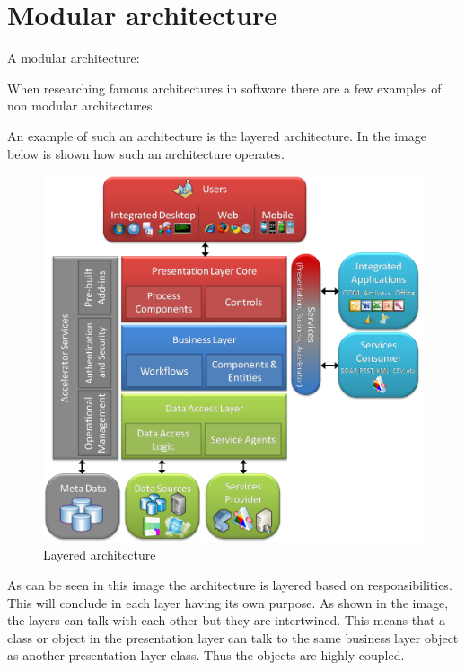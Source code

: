 \chapter{Modular architecture}
\label{sec:ModularArchitecture}

A modular architecture:

When researching famous architectures in software there are a few examples of non modular architectures.

An example of such an architecture is the layered architecture. In the image below is shown how such an architecture operates.

\begin{figure}[H]
	\includegraphics[width=\linewidth]{layered_architecture.png}
	\caption{Layered architecture \cite{layeredArchitecture}}
\end{figure}

As can be seen in this image the architecture is layered based on responsibilities. This will conclude in each layer having its own purpose. As shown in the image, the layers can talk with each other but they are intertwined. This means that a class or object in the presentation layer can talk to the same business layer object as another presentation layer class. Thus the objects are highly coupled.

